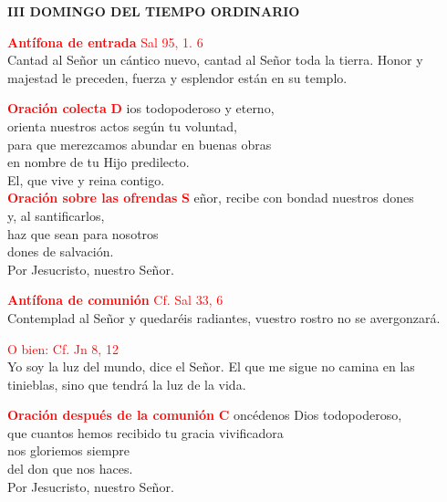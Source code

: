 \documentclass[12pt, letterpaper]{report}
\begin{document}

\begin{center}
\Huge {\bfseries III DOMINGO DEL TIEMPO ORDINARIO}
\end{center}

\Large {\textcolor{red}{ \textbf{Ant\'ifona de entrada} \hspace{1cm} Sal 95, 1. 6}}\\
\Large {Cantad al Se\~nor un c\'antico nuevo, cantad al Se\~nor toda la tierra. Honor y majestad le preceden, fuerza y esplendor est\'an en su templo.}

\Large {\bfseries \textcolor{red}{Oraci\'on colecta}}
\lettrine[lines=2]{\bfseries \textcolor{red}{D}}{} \Large ios todopoderoso y eterno,\\
orienta nuestros actos seg\'un tu voluntad,\\
para que merezcamos abundar en buenas obras\\
en nombre de tu Hijo predilecto.\\
El, que vive y reina contigo.\\

\Large {\bfseries \textcolor{red}{Oraci\'on sobre las ofrendas}}
\lettrine[lines=2]{\bfseries \textcolor{red}{S}}{} \Large e\~nor, recibe con bondad nuestros dones\\
y, al santificarlos,\\
haz que sean para nosotros\\
dones de salvaci\'on.\\
Por Jesucristo, nuestro Se\~nor.

\Large {\textcolor{red}{ \textbf{Ant\'ifona de comuni\'on} \hspace{1cm}  Cf. Sal 33, 6}}\\
\Large {Contemplad al Se\~nor y quedar\'eis radiantes, vuestro rostro no se avergonzar\'a.}

\Large {\textcolor{red}{O bien: \hspace{1cm}  Cf. Jn 8, 12}}\\
\Large {Yo soy la luz del mundo, dice el Se\~nor. El que me sigue no camina en las tinieblas, sino que tendr\'a la luz de la vida.}

\newpage

\Large {\bfseries \textcolor{red}{Oraci\'on despu\'es de la comuni\'on}}
\lettrine[lines=2]{\bfseries \textcolor{red}{C}}{} \Large onc\'edenos Dios todopoderoso,\\
que cuantos hemos recibido tu gracia vivificadora\\
nos gloriemos siempre\\
del don que nos haces.\\
Por Jesucristo, nuestro Se\~nor.
\end{document}
